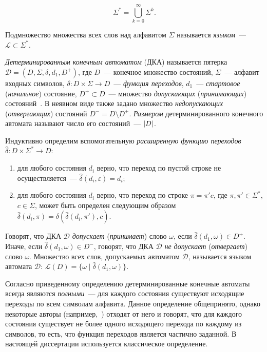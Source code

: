 \begin{equation*}
\Sigma^{*} = \bigcup_{k=0}^{\infty}\Sigma^{k}.
\end{equation*}

Подмножество множества всех слов над алфавитом $\Sigma$ называется \emph{языком}~--- $\mathcal{L} \subset \Sigma^{*}$.

\emph{Детерминированным конечным автоматом} (ДКА) называется пятерка $\mathcal{D} = \left(D,\Sigma,\delta,d_{1},D^{+}\right)$, где $D$~{---} конечное множество состояний, $\Sigma$~{---} алфавит входных символов, $\delta:D \times \Sigma \rightarrow D$~{---} \emph{функция переходов}, $d_{1}$~{---} \emph{стартовое} (\emph{начальное}) состояние, $D^{+} \subset D$~{---} множество \emph{допускающих} (\emph{принимающих}) состояний~\cite{automata-hopcroft-2001}. 
В неявном виде также задано множество \emph{недопускающих} (\emph{отвергающих}) состояний $D^{-} = D \setminus D^{+}$.
\emph{Размером} детерминированного конечного автомата называют число его состояний~--- $\lvert D\rvert$.

Индуктивно определим вспомогательную \emph{расширенную функцию переходов} $\hat{\delta}: D \times \Sigma^{*} \rightarrow D$:
\begin{enumerate}
  \item для любого состояния $d_{i}$ верно, что переход по пустой строке не осуществляется~{---} $\hat{\delta}\left(d_{i},\varepsilon\right) = d_{i}$;
  \item для любого состояния $d_{i}$ верно, что переход по строке $\pi = \pi'c$, где $\pi,\pi' \in \Sigma^{*}$, $c \in \Sigma$, может быть определен следующим образом $\hat{\delta}\left(d_{i}, \pi\right) = \delta\left(\hat{\delta}\left(d_{i}, \pi'\right), c\right)$.
\end{enumerate}
Говорят, что ДКА $\mathcal{D}$ \emph{допускает} (\emph{принимает}) слово $\omega$, если $\hat{\delta}\left(d_{1}, \omega\right) \in D^{+}$. 
Иначе, если $\hat{\delta}\left(d_{1}, \omega\right) \in D^{-}$, говорят, что ДКА $\mathcal{D}$ \emph{не допускает} (\emph{отвергает}) слово $\omega$. 
Множество всех слов, допускаемых автоматом $\mathcal{D}$, называется языком автомата $\mathcal{D}$: $\mathcal{L}\left(D\right) = \{\omega \mid \hat{\delta}\left(d_{1}, \omega \right)\}$.

Согласно приведенному определению детерминированные конечные автоматы всегда являются \emph{полными}~--- для каждого состояния существуют исходящие переходы по всем символам алфавита. 
Данное определение общепринято, однако некоторые авторы (например,~\cite{mogensen-analysis-11}) отходят от него и говорят, что для каждого состояния существует не более одного исходящего перехода по каждому из символов, то есть, что функция переходов является частично заданной.
В настоящей диссертации используется классическое определение.

